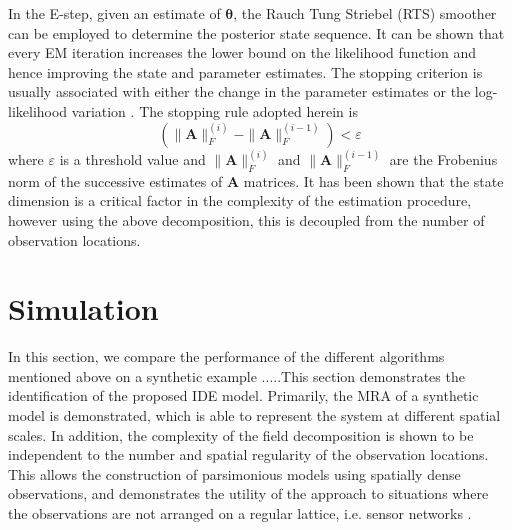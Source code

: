 \documentclass[11pt,draftcls,onecolumn,peerreview]{IEEEtran}
\begin{document}
In the E-step, given an estimate of $\boldsymbol\theta$, the Rauch Tung Striebel (RTS) smoother can be employed to determine the posterior state sequence. It can be shown that \cite{Dempster1977,Gibsona2005} every EM iteration increases the lower bound on the likelihood function and hence improving the state and parameter estimates. The stopping criterion is usually associated  with  either the change in the parameter estimates or the log-likelihood variation \cite{McLachlan1997}. The stopping rule adopted herein is
\begin{equation}
\left(\parallel \mathbf{A} \parallel_{F}^{(i)}-\parallel \mathbf{A} \parallel_{F}^{(i-1)}\right)<\varepsilon 
\end{equation}
where $\varepsilon$ is a threshold value and $\parallel \mathbf{A} \parallel_{F}^{(i)}$ and $ \parallel \mathbf{A} \parallel_{F}^{(i-1)}$ are the Frobenius norm  of the successive estimates of $\mathbf{A} $ matrices. It has been shown \cite{Dewar2009} that the state dimension is a critical factor in the complexity of the estimation procedure, however using the above decomposition, this is decoupled from the number of observation locations.
\section{Simulation}
In this section, we compare the performance of the different algorithms mentioned above on a synthetic example .....This section demonstrates the identification of the proposed IDE model. Primarily, the MRA of a synthetic model is demonstrated, which is able to represent the system at different spatial scales. In addition, the complexity of the field decomposition is shown to be independent to the number and spatial regularity of the observation locations. This allows the construction of parsimonious models using spatially dense observations, and demonstrates the utility of the approach to situations where the observations are not arranged on a regular lattice, i.e. sensor networks \cite{Sahu2008}.
\end{document}
